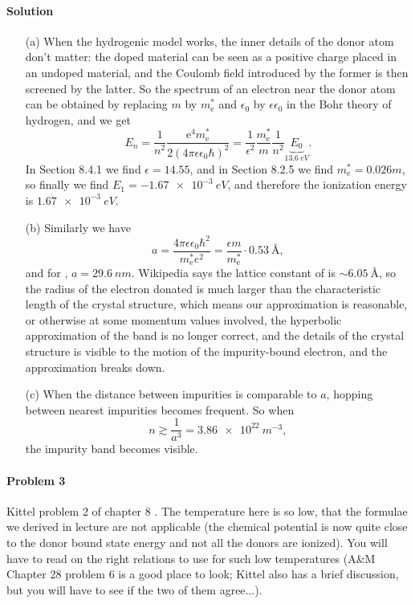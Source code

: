 \documentclass[hyperref, a4paper]{article}
\begin{document}
\paragraph{Solution} \begin{itemize}
\item[(a)] When the hydrogenic model works,
the inner details of the donor atom don't matter: 
the doped material can be seen as a positive charge 
placed in an undoped material,
and the Coulomb field introduced by the former is then screened by the latter.
So the spectrum of an electron near the donor atom can be obtained 
by replacing $m$ by $m^*_{\text{e}}$ and $\epsilon_0$ by $\epsilon \epsilon_0$
in the Bohr theory of hydrogen, 
and we get 
\begin{equation}
    E_n = \frac{1}{n^2} \frac{\mathrm{e}^4 m^*_{\mathrm{e}}}{2\left(4 \pi \epsilon \epsilon_0 \hbar\right)^2}
    = \frac{1}{\epsilon^2} \frac{m^*_{\text{e}}}{m} \frac{1}{n^2} \underbrace{E_0}_{\SI{13.6}{eV}}.
\end{equation}
In Section 8.4.1 we find $\epsilon = 14.55$, and in Section 8.2.5 we find $m_{\text{e}}^* = 0.026 m$,
so finally we find $E_1 = - \SI{1.67e-3}{eV}$,
and therefore the ionization energy is $\SI{1.67e-3}{eV}$.

\item[(b)] Similarly we have 
\begin{equation}
    a = \frac{4 \pi \epsilon \epsilon_0 \hbar^2}{m_{\text{e}}^* e^2} = \frac{\epsilon m}{m_{\text{e}}^*} \cdot \SI{0.53}{\angstrom},
\end{equation}
and for , $a = \SI{29.6}{nm}$.
Wikipedia says the lattice constant of  is $\sim \SI{6.05}{\angstrom}$,
so the radius of the electron donated is much larger than the characteristic length of the crystal structure,
which means our approximation is reasonable,
or otherwise at some momentum values involved,
the hyperbolic approximation of the band is no longer correct,
and the details of the crystal structure is visible 
to the motion of the impurity-bound electron,
and the approximation breaks down.

\item[(c)] When the distance between impurities is comparable to $a$,
hopping between nearest impurities becomes frequent.
So when 
\[
    n \gtrsim \frac{1}{a^3} = \SI{3.86e22}{m^{-3}},
\]
the impurity band becomes visible.

\end{itemize}

\paragraph{Problem 3} Kittel problem 2 of chapter 8 . The temperature here is so low, that the formulae we derived in lecture are not applicable (the chemical potential is now quite close to the donor bound state energy and not all the donors are ionized). You will have to read on the right relations to use for such low temperatures (A\&M
Chapter 28 problem 6 is a good place to look; Kittel also has a brief discussion, but you will have to see if the two of them agree...). 
\end{document}
